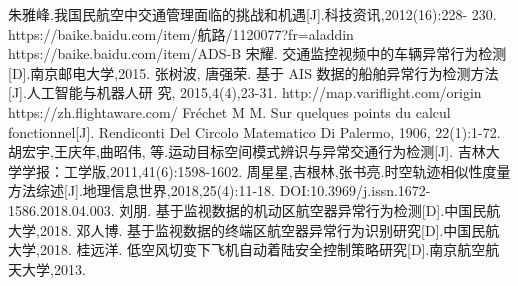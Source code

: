 \documentclass[GBK]{ctexart}
\begin{document}
\normalem
%
\begin{thebibliography}{99}%
 朱雅峰.我国民航空中交通管理面临的挑战和机遇[J].科技资讯,2012(16):228-
230.
 https://baike.baidu.com/item/航路/1120077?fr=aladdin
https://baike.baidu.com/item/ADS-B
宋耀. 交通监控视频中的车辆异常行为检测[D].南京邮电大学,2015.
张树波, 唐强荣. 基于 AIS 数据的船舶异常行为检测方法[J].人工智能与机器人研
究, 2015,4(4),23-31.
http://map.variflight.com/origin
https://zh.flightaware.com/
  Fréchet M M. Sur quelques points du calcul fonctionnel[J]. Rendiconti Del Circolo Matematico Di Palermo, 1906, 22(1):1-72.
  胡宏宇,王庆年,曲昭伟, 等.运动目标空间模式辨识与异常交通行为检测[J]. 吉林大学学报：工学版,2011,41(6):1598-1602.
 周星星,吉根林,张书亮.时空轨迹相似性度量方法综述[J].地理信息世界,2018,25(4):11-18. DOI:10.3969/j.issn.1672-1586.2018.04.003.
刘朋. 基于监视数据的机动区航空器异常行为检测[D].中国民航大学,2018.
邓人博. 基于监视数据的终端区航空器异常行为识别研究[D].中国民航大学,2018.
桂远洋. 低空风切变下飞机自动着陆安全控制策略研究[D].南京航空航天大学,2013.
\end{thebibliography}
\end{document}
